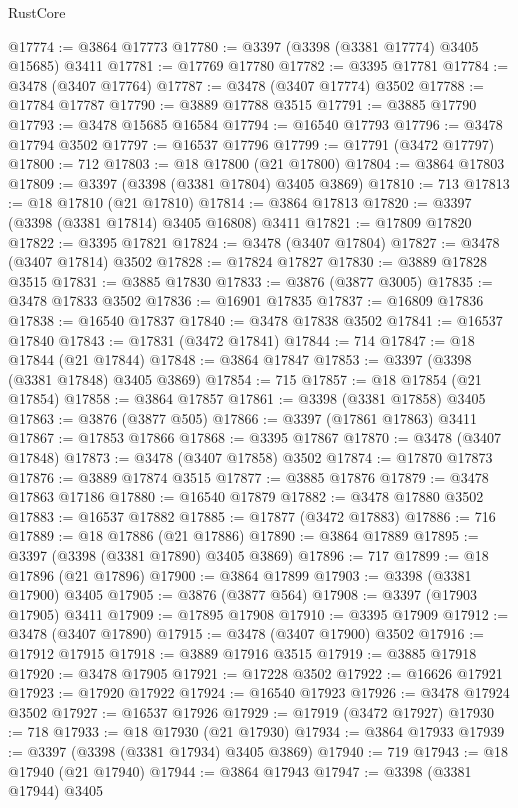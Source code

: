 \begin{lexlean}{RustCore}
\begin{coremodule}
@17774 := @3864 @17773
@17780 := @3397 (@3398 (@3381 @17774) @3405 @15685) @3411
@17781 := @17769 @17780
@17782 := @3395 @17781
@17784 := @3478 (@3407 @17764)
@17787 := @3478 (@3407 @17774) @3502
@17788 := @17784 @17787
@17790 := @3889 @17788 @3515
@17791 := @3885 @17790
@17793 := @3478 @15685 @16584
@17794 := @16540 @17793
@17796 := @3478 @17794 @3502
@17797 := @16537 @17796
@17799 := @17791 (@3472 @17797)
@17800 := 712
@17803 := @18 @17800 (@21 @17800)
@17804 := @3864 @17803
@17809 := @3397 (@3398 (@3381 @17804) @3405 @3869)
@17810 := 713
@17813 := @18 @17810 (@21 @17810)
@17814 := @3864 @17813
@17820 := @3397 (@3398 (@3381 @17814) @3405 @16808) @3411
@17821 := @17809 @17820
@17822 := @3395 @17821
@17824 := @3478 (@3407 @17804)
@17827 := @3478 (@3407 @17814) @3502
@17828 := @17824 @17827
@17830 := @3889 @17828 @3515
@17831 := @3885 @17830
@17833 := @3876 (@3877 @3005)
@17835 := @3478 @17833 @3502
@17836 := @16901 @17835
@17837 := @16809 @17836
@17838 := @16540 @17837
@17840 := @3478 @17838 @3502
@17841 := @16537 @17840
@17843 := @17831 (@3472 @17841)
@17844 := 714
@17847 := @18 @17844 (@21 @17844)
@17848 := @3864 @17847
@17853 := @3397 (@3398 (@3381 @17848) @3405 @3869)
@17854 := 715
@17857 := @18 @17854 (@21 @17854)
@17858 := @3864 @17857
@17861 := @3398 (@3381 @17858) @3405
@17863 := @3876 (@3877 @505)
@17866 := @3397 (@17861 @17863) @3411
@17867 := @17853 @17866
@17868 := @3395 @17867
@17870 := @3478 (@3407 @17848)
@17873 := @3478 (@3407 @17858) @3502
@17874 := @17870 @17873
@17876 := @3889 @17874 @3515
@17877 := @3885 @17876
@17879 := @3478 @17863 @17186
@17880 := @16540 @17879
@17882 := @3478 @17880 @3502
@17883 := @16537 @17882
@17885 := @17877 (@3472 @17883)
@17886 := 716
@17889 := @18 @17886 (@21 @17886)
@17890 := @3864 @17889
@17895 := @3397 (@3398 (@3381 @17890) @3405 @3869)
@17896 := 717
@17899 := @18 @17896 (@21 @17896)
@17900 := @3864 @17899
@17903 := @3398 (@3381 @17900) @3405
@17905 := @3876 (@3877 @564)
@17908 := @3397 (@17903 @17905) @3411
@17909 := @17895 @17908
@17910 := @3395 @17909
@17912 := @3478 (@3407 @17890)
@17915 := @3478 (@3407 @17900) @3502
@17916 := @17912 @17915
@17918 := @3889 @17916 @3515
@17919 := @3885 @17918
@17920 := @3478 @17905
@17921 := @17228 @3502
@17922 := @16626 @17921
@17923 := @17920 @17922
@17924 := @16540 @17923
@17926 := @3478 @17924 @3502
@17927 := @16537 @17926
@17929 := @17919 (@3472 @17927)
@17930 := 718
@17933 := @18 @17930 (@21 @17930)
@17934 := @3864 @17933
@17939 := @3397 (@3398 (@3381 @17934) @3405 @3869)
@17940 := 719
@17943 := @18 @17940 (@21 @17940)
@17944 := @3864 @17943
@17947 := @3398 (@3381 @17944) @3405

\end{coremodule}
\end{lexlean}
